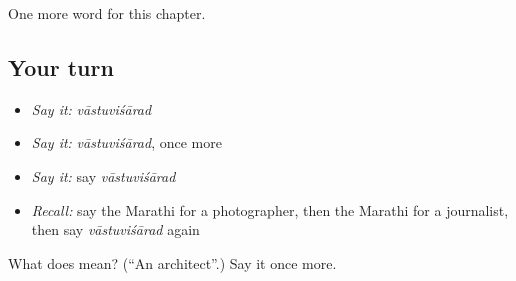 \begin{grammarlens}[title={What you've built}]
One more word for this chapter.
\end{grammarlens}

\subsection*{Your turn}
\begin{itemize}
\raggedright
  \item \emph{Say it:} \emph{vāstuviśārad}
  \item \emph{Say it:} \emph{vāstuviśārad}, once more
  \item \emph{Say it:} say \emph{vāstuviśārad}
  \item \emph{Recall:} say the Marathi for a photographer, then the Marathi for a journalist, then say \emph{vāstuviśārad} again
\end{itemize}

\begin{tcolorbox}[breakable,colback=teal!4,colframe=teal!35!black,title={Before you move on}]
What does  mean? (\textquotedblleft{}An architect\textquotedblright{}.) Say it once more.
\end{tcolorbox}
